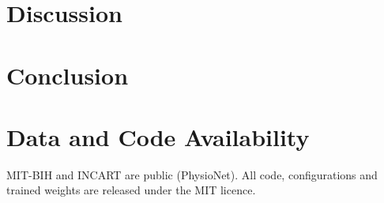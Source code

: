 \documentclass[journal]{IEEEtran}
\begin{document}
\section{Discussion}

\section{Conclusion}

\section*{Data and Code Availability}
MIT-BIH and INCART are public (PhysioNet). All code, configurations and trained weights are
released under the MIT licence.



\end{document}
